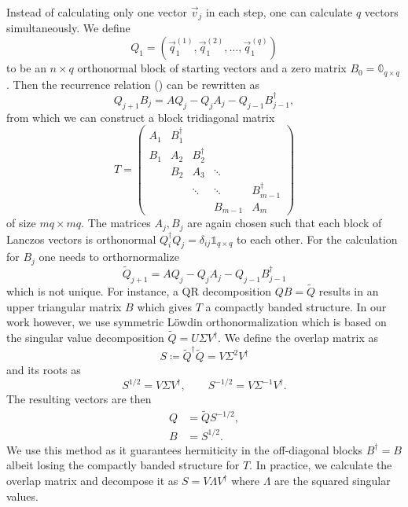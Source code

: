 Instead of calculating only one vector $\vec{v}_j$ in each step,
one can calculate $q$ vectors simultaneously.
We define
\begin{equation}
    Q_1 = (\vec{q}_1^{(1)}, \vec{q}_1^{(2)}, \ldots, \vec{q}_1^{(q)})
\end{equation}
to be an
$n\times q$ orthonormal block of starting vectors
and a zero matrix $B_0 = \mathbb{0}_{q\times q}$.
Then the recurrence relation () can be rewritten as
\begin{equation}
    Q_{j+1} B_j = A Q_j - Q_j A_j - Q_{j-1} B_{j-1}^\dag,
    \label{eq:block-Lanczos-recurrence}
\end{equation}
from which we can construct a block tridiagonal matrix
\begin{equation}
    T
    =
    \begin{pmatrix}
        A_1 & B_1^\dag &          &         &              \\
        B_1 & A_2      & B_2^\dag &         &              \\
            & B_2      & A_3      & \ddots  &              \\
            &          & \ddots   & \ddots  & B_{m-1}^\dag \\
            &          &          & B_{m-1} & A_m
    \end{pmatrix}
\end{equation}
of size $mq\times mq$.
The matrices $A_j, B_j$ are again chosen such that each block of Lanczos vectors is orthonormal
$Q_i^\dag Q_j = \delta_{ij}\mathbb{1}_{q\times q}$ to each other.
For the calculation for $B_j$ one needs to orthornormalize
\begin{equation}
    \tilde Q_{j+1} = A Q_j - Q_j A_j - Q_{j-1} B_{j-1}^\dag
\end{equation}
which is not unique.
For instance, a QR decomposition \cite{Cullum1985, Grimes1994} $Q B = \tilde{Q}$
results in an upper triangular matrix $B$ which gives $T$ a compactly banded structure.
In our work however, we use symmetric Löwdin orthonormalization \cite{Lowdin1950, Brass2021}
which is based on the singular value decomposition $\tilde Q = U \Sigma V^\dag$.
We define the overlap matrix as
\begin{equation}
    S \coloneqq \tilde Q^\dag \tilde Q = V \Sigma^{2} V^\dagger
\end{equation}
and its roots as
\begin{equation}
    S^{1/2}  = V \Sigma V^\dagger, \qquad S^{-1/2} = V \Sigma^{-1} V^\dagger.
\end{equation}
The resulting vectors are then
\begin{align}
    Q & = \tilde Q S^{-1/2}, \\
    B & = S^{1/2}.
\end{align}
We use this method as it guarantees hermiticity in the off-diagonal blocks $B^\dag = B$
albeit losing the compactly banded structure for $T$.
In practice, we calculate the overlap matrix and decompose it as $S = V \Lambda V^\dag$
where $\Lambda$ are the squared singular values.

